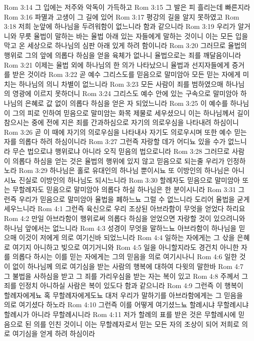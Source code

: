 Rom 3:14  그 입에는 저주와 악독이 가득하고
Rom 3:15  그 발은 피 흘리는데 빠른지라
Rom 3:16  파멸과 고생이 그 길에 있어
Rom 3:17  평강의 길을 알지 못하였고
Rom 3:18  저희 눈앞에 하나님을 두려워함이 없느니라 함과 같으니라
Rom 3:19  우리가 알거니와 무릇 율법이 말하는 바는 율법 아래 있는 자들에게 말하는 것이니 이는 모든 입을 막고 온 세상으로 하나님의 심판 아래 있게 하려 함이니라
Rom 3:20  그러므로 율법의 행위로 그의 앞에 의롭다 하심을 얻을 육체가 없나니 율법으로는 죄를 깨달음이니라
Rom 3:21  이제는 율법 외에 하나님의 한 의가 나타났으니 율법과 선지자들에게 증거를 받은 것이라
Rom 3:22  곧 예수 그리스도를 믿음으로 말미암아 모든 믿는 자에게 미치는 하나님의 의니 차별이 없느니라
Rom 3:23  모든 사람이 죄를 범하였으매 하나님의 영광에 이르지 못하더니
Rom 3:24  그리스도 예수 안에 있는 구속으로 말미암아 하나님의 은혜로 값 없이 의롭다 하심을 얻은 자 되었느니라
Rom 3:25  이 예수를 하나님이 그의 피로 인하여 믿음으로 말미암는 화목 제물로 세우셨으니 이는 하나님께서 길이 참으시는 중에 전에 지은 죄를 간과하심으로 자기의 의로우심을 나타내려 하심이니
Rom 3:26  곧 이 때에 자기의 의로우심을 나타내사 자기도 의로우시며 또한 예수 믿는 자를 의롭다 하려 하심이니라
Rom 3:27  그런즉 자랑할 데가 어디뇨 있을 수가 없느니라 무슨 법으로냐 행위로냐 아니라 오직 믿음의 법으로니라
Rom 3:28  그러므로 사람이 의롭다 하심을 얻는 것은 율법의 행위에 있지 않고 믿음으로 되는줄 우리가 인정하노라
Rom 3:29  하나님은 홀로 유대인의 하나님 뿐이시뇨 또 이방인의 하나님은 아니시뇨 진실로 이방인의 하나님도 되시느니라
Rom 3:30  할례자도 믿음으로 말미암아 또는 무할례자도 믿음으로 말미암아 의롭다 하실 하나님은 한 분이시니라
Rom 3:31  그런즉 우리가 믿음으로 말미암아 율법을 폐하느뇨 그럴 수 없느니라 도리어 율법을 굳게 세우느니라
Rom 4:1  그런즉 육신으로 우리 조상된 아브라함이 무엇을 얻었다 하리요
Rom 4:2  만일 아브라함이 행위로써 의롭다 하심을 얻었으면 자랑할 것이 있으려니와 하나님 앞에서는 없느니라
Rom 4:3  성경이 무엇을 말하느뇨 아브라함이 하나님을 믿으매 이것이 저에게 의로 여기신바 되었느니라
Rom 4:4  일하는 자에게는 그 삯을 은혜로 여기지 아니하고 빚으로 여기거니와
Rom 4:5  일을 아니할지라도 경건치 아니한 자를 의롭다 하시는 이를 믿는 자에게는 그의 믿음을 의로 여기시나니
Rom 4:6  일한 것이 없이 하나님께 의로 여기심을 받는 사람의 행복에 대하여 다윗의 말한바
Rom 4:7  그 불법을 사하심을 받고 그 죄를 가리우심을 받는 자는 복이 있고
Rom 4:8  주께서 그 죄를 인정치 아니하실 사람은 복이 있도다 함과 같으니라
Rom 4:9  그런즉 이 행복이 할례자에게뇨 혹 무할례자에게도뇨 대저 우리가 말하기를 아브라함에게는 그 믿음을 의로 여기셨다 하노라
Rom 4:10  그런즉 이를 어떻게 여기셨느뇨 할례시냐 무할례시냐 할례시가 아니라 무할례시니라
Rom 4:11  저가 할례의 표를 받은 것은 무할례시에 믿음으로 된 의를 인친 것이니 이는 무할례자로서 믿는 모든 자의 조상이 되어 저희로 의로 여기심을 얻게 하려 하심이라
